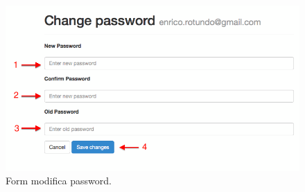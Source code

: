 \begin{enumerate}
			\begin{figure}[H]
				\centering \includegraphics[width=1\textwidth]{img/changePwdForm.png}
			\caption{ \label{fig:changePwdForm} Form modifica password.}
			\end{figure}

		\end{enumerate}
